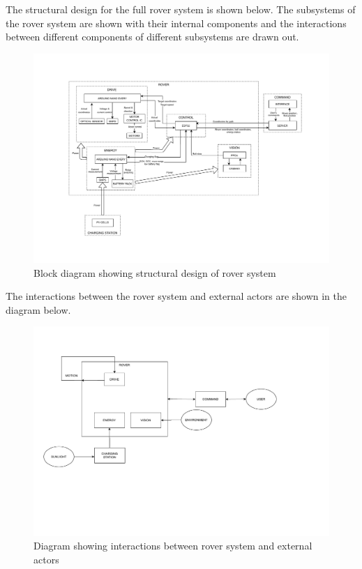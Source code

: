 \documentclass[10pt,twoside]{article}
\begin{document}
The structural design for the full rover system is shown below. The subsystems of the rover system are shown with their internal components and the interactions between different components of different subsystems are drawn out. 
\begin{figure}[hbt]
    \centering
    \includegraphics[scale = 0.5, trim={3cm 2cm 2cm 2cm},clip]{StructuralDiagram (1).pdf}
    \caption{Block diagram showing structural design of rover system}
    \label{fig:StructuralDesign}
\end{figure}

The interactions between the rover system and external actors are shown in the diagram below.
\begin{figure}[hbt!]
\centering
  \includegraphics[scale = 0.28, trim={0, 6cm, 0, 3cm},clip]{Context.pdf}
  \caption{Diagram showing interactions between rover system and external actors}
  \label{fig:ContextDiagram}
\end{figure}
\end{document}
